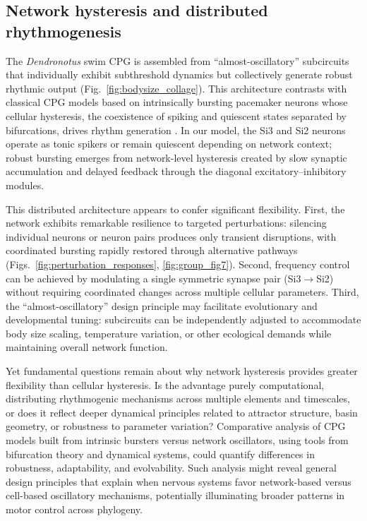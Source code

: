 \documentclass[nofootinbib,aip,amsmath,amssymb,preprint,twocolumn,floatfix,10pt]{revtex4-2}
\begin{document}
\subsection{Network hysteresis and distributed rhythmogenesis}

The \textit{Dendronotus} swim CPG is assembled from ``almost-oscillatory'' subcircuits that individually exhibit subthreshold dynamics but collectively generate robust rhythmic output (Fig.~\ref{fig:bodysize_collage}). This architecture contrasts with classical CPG models based on intrinsically bursting pacemaker neurons whose cellular hysteresis, the coexistence of spiking and quiescent states separated by bifurcations, drives rhythm generation \cite{plant81, Rinzel87b, RL87}. In our model, the Si3 and Si2 neurons operate as tonic spikers or remain quiescent depending on network context; robust bursting emerges from network-level hysteresis created by slow synaptic accumulation and delayed feedback through the diagonal excitatory--inhibitory modules.

This distributed architecture appears to confer significant flexibility. First, the network exhibits remarkable resilience to targeted perturbations: silencing individual neurons or neuron pairs produces only transient disruptions, with coordinated bursting rapidly restored through alternative pathways (Figs.~\ref{fig:perturbation_responses}, \ref{fig:group_fig7}). Second, frequency control can be achieved by modulating a single symmetric synapse pair (Si3$\to$Si2) without requiring coordinated changes across multiple cellular parameters. Third, the ``almost-oscillatory'' design principle may facilitate evolutionary and developmental tuning: subcircuits can be independently adjusted to accommodate body size scaling, temperature variation, or other ecological demands while maintaining overall network function.

Yet fundamental questions remain about why network hysteresis provides greater flexibility than cellular hysteresis. Is the advantage purely computational, distributing rhythmogenic mechanisms across multiple elements and timescales, or does it reflect deeper dynamical principles related to attractor structure, basin geometry, or robustness to parameter variation? Comparative analysis of CPG models built from intrinsic bursters versus network oscillators, using tools from bifurcation theory and dynamical systems, could quantify differences in robustness, adaptability, and evolvability. Such analysis might reveal general design principles that explain when nervous systems favor network-based versus cell-based oscillatory mechanisms, potentially illuminating broader patterns in motor control across phylogeny.
\end{document}
